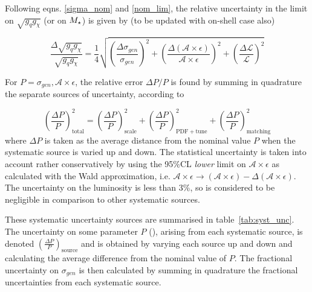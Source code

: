 Following eqns. \ref{sigma_nom} and \ref{nom_lim}, the relative uncertainty in the limit on $\sqrt{g_q g_{\chi}}$ (or on $M_{\star}$) is given by (to be updated with on-shell case also)

\begin{equation}
\label{unc_lim}
\frac{\Delta \sqrt{g_q g_{\chi}}}{\sqrt{g_q g_{\chi}}} = \frac{1}{4} \sqrt{\left( \frac{\Delta \sigma_{gen}}{\sigma_{gen}} \right)^2 + \left( \frac{\Delta (\mathcal{A} \times \epsilon)}{\mathcal{A} \times \epsilon} \right)^2 + \left( \frac{\Delta \mathcal{L}}{\mathcal{L}} \right)^2}
\end{equation}

For $P = \sigma_{gen}, \mathcal{A} \times \epsilon$, the relative error $\Delta P / P$ is found by summing in quadrature the separate sources of uncertainty, according to

\begin{equation}
\label{unc_P}
\left ( \frac{\Delta P}{P} \right )^2_{\mathrm{total}} = \left ( \frac{\Delta P}{P} \right )^2_{\mathrm{scale}} + \left ( \frac{\Delta P}{P} \right )^2_{\mathrm{PDF+tune}} + \left ( \frac{\Delta P}{P} \right )^2_{\mathrm{matching}}
\end{equation}
where $\Delta P$ is taken as the average distance from the nominal value $P$ when the systematic source is varied up and down. The statistical uncertainty is taken into account rather conservatively by using the 95\%CL \emph{lower} limit on $\mathcal{A} \times \epsilon$ as calculated with the Wald approximation, i.e. $\mathcal{A} \times \epsilon \rightarrow (\mathcal{A} \times \epsilon) - \Delta(\mathcal{A} \times \epsilon)$. The uncertainty on the luminosity is less than 3\%, so is considered to be negligible in comparison to other systematic sources.

\bigskip
\bigskip

\iffalse
{}

These systematic uncertainty sources are summarised in table~\ref{tab:syst_unc}. The uncertainty on some parameter $P$ (), arising from each systematic source, is denoted $\left ( \frac{\Delta P}{P} \right)_{\mathrm{source}}$ and is obtained by varying each source up and down and calculating the average difference from the nominal value of $P$. The fractional uncertainty on $\sigma_{gen}$ is then calculated by summing in quadrature the fractional uncertainties from each systematic source.


